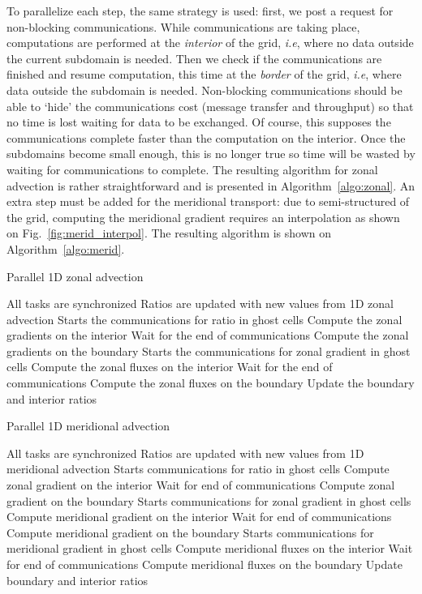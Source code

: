 To parallelize each step, the same strategy is used: first, we post a request
for non-blocking communications. While communications are taking place,
computations are performed at the \textit{interior} of the grid, \textit{i.e},
where no data outside the current subdomain is needed. Then we check if the
communications are finished and resume computation, this time at the
\textit{border} of the grid, \textit{i.e}, where data outside the subdomain is
needed. Non-blocking communications should be able to `hide' the communications
cost (message transfer and throughput) so that no time is lost waiting for data
to be exchanged. Of course, this supposes the communications
complete faster than the computation on the interior. Once the subdomains become
small enough, this is no longer true so time will be wasted by waiting for
communications to complete.
The resulting algorithm for zonal advection is rather straightforward and is
presented in Algorithm~\ref{algo:zonal}. An extra step must be added for the
meridional transport: due to semi-structured of the grid, computing the
meridional gradient requires an interpolation as shown on
Fig.~\ref{fig:merid_interpol}. The resulting algorithm is shown on
Algorithm~\ref{algo:merid}.
\begin{algorithm}
  \caption{Parallel 1D zonal advection}
\label{algo:zonal}
  \begin{algorithmic}
    \Require All tasks are synchronized
    \Ensure Ratios are updated with new values from 1D zonal advection
    \State Starts the communications for ratio in ghost cells 
    \State Compute the zonal gradients on the interior
    \State Wait for the end of communications
    \State Compute the zonal gradients on the boundary
    \State
    \State Starts the communications for zonal gradient in ghost cells
    \State Compute the zonal fluxes on the interior
    \State Wait for the end of communications
    \State Compute the zonal fluxes on the boundary
    \State
    \State Update the boundary and interior ratios
  \end{algorithmic}
\end{algorithm}

\begin{algorithm}  
  \caption{Parallel 1D meridional advection}
\label{algo:merid}
  \begin{algorithmic}
    \Require All tasks are synchronized
    \Ensure Ratios are updated with new values from 1D meridional advection
    \State Starts communications for ratio in ghost cells 
    \State Compute zonal gradient on the interior
    \State Wait for end of communications
    \State Compute zonal gradient on the boundary
    \State
    \State Starts communications for zonal gradient in ghost cells
    \State Compute meridional gradient on the interior
    \State Wait for end of communications
    \State Compute meridional gradient on the boundary
    \State
    \State Starts communications for meridional gradient in ghost cells
    \State Compute meridional fluxes on the interior
    \State Wait for end of communications
    \State Compute meridional fluxes on the boundary
    \State
    \State Update boundary and interior ratios
  \end{algorithmic}
\end{algorithm}

